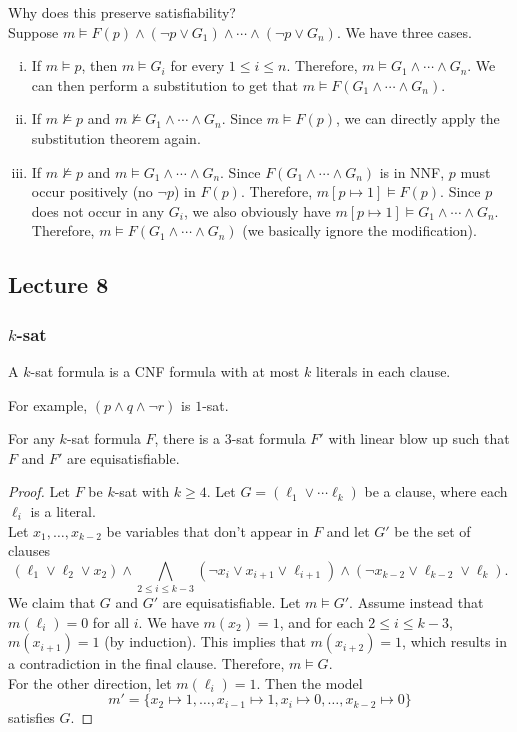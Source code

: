 Why does this preserve satisfiability?\\
Suppose $m\vDash F(p)\land(\neg p\lor G_1)\land\cdots\land(\neg p\lor G_n)$. We have three cases.
\begin{enumerate}[(i)]
	\item If $m\vDash p$, then $m\vDash G_i$ for every $1\leq i\leq n$. Therefore, $m\vDash G_1\land\cdots\land G_n$. We can then perform a substitution to get that $m\vDash F(G_1\land\cdots\land G_n)$.
	\item If $m\nvDash p$ and $m\nvDash G_1\land\cdots\land G_n$. Since $m\vDash F(p)$, we can directly apply the substitution theorem again.
	\item If $m\nvDash p$ and $m\vDash G_1\land\cdots\land G_n$. Since $F(G_1\land\cdots\land G_n)$ is in NNF, $p$ must occur positively (no $\neg p$) in $F(p)$. Therefore, $m[p\mapsto 1]\vDash F(p)$. Since $p$ does not occur in any $G_i$, we also obviously have $m[p\mapsto 1]\vDash G_1\land\cdots\land G_n$. Therefore, $m\vDash F(G_1\land\cdots\land G_n)$ (we basically ignore the modification).
\end{enumerate}

\subsection{Lecture 8}

\subsubsection{\texorpdfstring{$k$}{k}-sat}

\begin{definition}
	A $k$-sat formula is a CNF formula with at most $k$ literals in each clause.
\end{definition}

For example, $(p\wedge q\wedge \neg r)$ is $1$-sat.

\begin{theorem}
	For any $k$-sat formula $F$, there is a $3$-sat formula $F'$ with linear blow up such that $F$ and $F'$ are equisatisfiable.
\end{theorem}
\begin{proof}
	Let $F$ be $k$-sat with $k\geq 4$. Let $G=(\ell_1\lor\cdots\ell_k)$ be a clause, where each $\ell_i$ is a literal.\\
	Let $x_1,\ldots,x_{k-2}$ be variables that don't appear in $F$ and let $G'$ be the set of clauses
	\[ (\ell_1\lor\ell_2\lor x_2) \land \bigwedge_{2\leq i\leq k-3} (\neg x_i \lor x_{i+1} \lor \ell_{i+1}) \land (\neg x_{k-2} \lor \ell_{k-2} \lor \ell_k). \]
	We claim that $G$ and $G'$ are equisatisfiable. Let $m\vDash G'$. Assume instead that $m(\ell_i)=0$ for all $i$. We have $m(x_2) = 1$, and for each $2\leq i\leq k-3$, $m(x_{i+1}) = 1$ (by induction). This implies that $m(x_{i+2}) = 1$, which results in a contradiction in the final clause. Therefore, $m\vDash G$.\\
	For the other direction, let $m(\ell_i)=1$. Then the model
	\[ m' = \{x_2\mapsto 1, \ldots,x_{i-1}\mapsto 1,x_i\mapsto 0,\ldots,x_{k-2}\mapsto 0\} \]
	satisfies $G$.
\end{proof}

